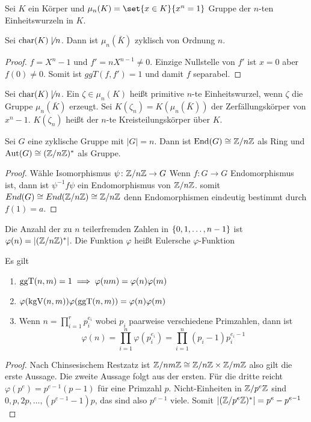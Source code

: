 \begin{Def}
    Sei $K$ ein Körper und $\mu_n(K)=\set{x\in K}{ x^n=1}$ Gruppe der $n$-ten Einheitswurzeln in $K$.
\end{Def}
\begin{Satz}
    Sei $\operatorname{char} (K) \not\mid n$. Dann ist $\mu_n(\bar K)$ zyklisch von Ordnung $n$.
\end{Satz}
\begin{proof}
    $f=X^n-1$ und $f'=nX^{n-1}\neq 0$. Einzige Nullstelle von $f'$ ist $x=0$ aber $f(0)\neq 0$. Somit ist $ggT(f,f')=1$ und damit $f$ separabel.
\end{proof}
\begin{Def}
    Sei $\operatorname{char} (K)\not\mid n$. Ein $\zeta\in\mu_n(K)$ heißt primitive $n$-te Einheitswurzel, wenn $\zeta$ die Gruppe $\mu_n(\bar K)$ erzeugt. Sei $K(\zeta_n)=K(\mu_n(\bar K))$ der Zerfällungskörper von $x^n-1$. $K(\zeta_n)$ heißt der $n$-te Kreisteilungskörper über $K$.
\end{Def}
\begin{Lemma}\label{Lem:MorGSn}
    Sei $G$ eine zyklische Gruppe mit $|G|=n$. Dann ist $\operatorname{End}(G)\cong \mathbb{Z}/n\mathbb{Z}$ als Ring und $\operatorname{Aut}(G)\cong (\mathbb{Z}/n\mathbb{Z})^*$ als Gruppe.
\end{Lemma}
\begin{proof}
    Wähle Isomorphismus $\psi\colon \mathbb{Z}/n\mathbb{Z}\to G$ Wenn $f\colon G\to G$ Endomorphismus ist, dann ist $\psi^{-1}f\psi$ ein Endomorphismus von $\mathbb{Z}/n\mathbb{Z}$.
    somit $End(G)\cong End(\mathbb{Z}/n\mathbb{Z})\cong \mathbb{Z}/n\mathbb{Z}$ denn Endomorphismen eindeutig bestimmt durch $f(1)=a$.
\end{proof}
\begin{Def}
   Die Anzahl der zu $n$ teilerfremden Zahlen in $\{0,1,\dots,n-1\}$ ist $\varphi(n)=\lvert(\mathbb{Z}/n\mathbb{Z})^*\rvert$. Die Funktion $\varphi$ heißt Eulersche $\varphi$-Funktion
\end{Def}
\begin{Lemma} Es gilt
    \begin{enumerate}
        \item  $\operatorname{ggT}(n,m)=1\implies \varphi(nm)=\varphi(n)\varphi(m)$
        \item $\varphi(\operatorname{kgV}(n,m))\varphi(\operatorname{ggT}(n,m))=\varphi(n)\varphi(m)$
        \item Wenn $n=\prod_{i=1}^rp_i^{e_i}$ wobei $p_i$ paarweise verschiedene Primzahlen, dann ist 
        $$\varphi(n)=\prod_{i=1}^n\varphi(p_i^{e_i})=\prod_{i=1}^n(p_i-1)p_i^{e_i-1}$$
    \end{enumerate}
\end{Lemma}
\begin{proof}
    Nach Chinsesischem Restzatz ist $\mathbb{Z}/nm\mathbb{Z}\cong \mathbb{Z}/n\mathbb{Z}\times \mathbb{Z}/m\mathbb{Z}$ also gilt die erste Aussage. Die zweite Aussage folgt aus der ersten.
    Für die dritte reicht $\varphi(p^e)=p^{e-1}(p-1)$ für eine Primzahl $p$.
    Nicht-Einheiten in $\mathbb{Z}/p^e\mathbb{Z}$ sind $0,p,2p,\dots,(p^{e-1}-1)p$, das sind also $p^{e-1}$ viele. Somit $|(\mathbb{Z}/p^e\mathbb{Z})^*|=p^e-p^{e-1}$
\end{proof}
